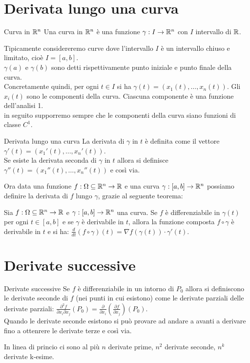 \section{Derivata lungo una curva}\label{sec:derivata-lungo-una-curva}

\begin{definizione}{Curva in $\mathbb{R}^n$}
Una curva in $\mathbb{R}^n$ è una funzione $\gamma: I \rightarrow \mathbb{R}^n$ con $I$ intervallo di $\mathbb{R}$.
\end{definizione}

Tipicamente considereremo curve dove l'intervallo $I$ è un intervallo chiuso e limitato, cioè $I=[a,b]$.\\
$\gamma(a)$ e $\gamma(b)$ sono detti rispettivamente punto iniziale e punto finale della curva.\\
Concretamente quindi, per ogni $t\in I$ si ha $\gamma(t)=(x_1(t), \dots, x_n(t))$. Gli $x_i(t)$ sono le componenti della curva. Ciascuna componente è una funzione dell'analisi 1.\\
in seguito supporremo sempre che le componenti della curva siano funzioni di classe $C^1$.

\begin{definizione}{Derivata lungo una curva}
  La derivata di $\gamma$ in $t$ è definita come il vettore $\gamma'(t)=(x_1'(t), \dots, x_n'(t))$.\\
  Se esiste la derivata seconda di $\gamma$ in $t$ allora si definisce $\gamma''(t)=(x_1''(t), \dots, x_n''(t))$ e così via.
\end{definizione}
Ora data una funzione $f:\Omega \subseteq \mathbb{R}^n \rightarrow \mathbb{R}$ e una curva $\gamma: [a,b] \rightarrow \mathbb{R}^n$ possiamo definire la derivata di $f$ lungo $\gamma$, grazie al seguente teorema:

\begin{teorema}{}
  Sia $f:\Omega \subseteq \mathbb{R}^n \rightarrow \mathbb{R}$ e $\gamma: [a,b] \rightarrow \mathbb{R}^n$ una curva. Se $f$ è differenziabile in $\gamma(t)$ per ogni $t \in [a,b]$ e se $\gamma$ è derivabile in $t$, allora la funzione composta $f \circ \gamma$ è derivabile in $t$ e si ha:
  $\frac{d}{dt}(f \circ \gamma)(t) = \nabla f(\gamma(t)) \cdot \gamma'(t)$.
\end{teorema}

\section{Derivate successive}
\begin{definizione}{Derivate successive}
  Se $f$ è differenziabile in un intorno di $P_0$ allora si definiscono le derivate seconde di $f$ (nei punti in cui esistono) come le derivate parziali delle derivate parziali: $\frac{\partial^2 f}{\partial x_i \partial x_j}(P_0) = \frac{\partial}{\partial x_i} \left(\frac{\partial f}{\partial x_j}\right)(P_0)$.  \\
  Quando le derivate seconde esistono si può provare ad andare a avanti a derivare fino a ottenrere le derivate terze e così via.
\end{definizione}
\begin{osservazione}{}
  In linea di princio ci sono al più $n$ derivate prime, $n^2$ derivate seconde, $n^k$ derivate k-esime.
\end{osservazione}

